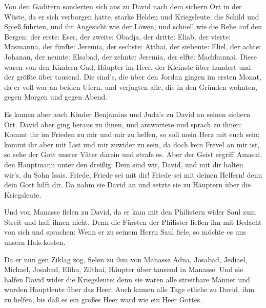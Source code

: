  Von den Gaditern sonderten sich aus zu David nach dem
sichern Ort in der Wüste, da er sich verborgen hatte, starke Helden und
Kriegsleute, die Schild und Spieß führten, und ihr Angesicht wie der
Löwen, und schnell wie die Rehe auf den Bergen:  der erste:
Eser, der zweite: Obadja, der dritte: Eliab,  der vierte:
Masmanna, der fünfte: Jeremia,  der sechste: Atthai, der
siebente: Eliel,  der achte: Johanan, der neunte: Elsabad,
 der zehnte: Jeremia, der elfte: Machbannai. 
Diese waren von den Kindern Gad, Häupter im Heer, der Kleinste über
hundert und der größte über tausend.  Die sind's, die über
den Jordan gingen im ersten Monat, da er voll war an beiden Ufern, und
verjagten alle, die in den Gründen wohnten, gegen Morgen und gegen
Abend.

 Es kamen aber auch Kinder Benjamins und Juda's zu David an
seinen sichern Ort.  David aber ging heraus zu ihnen, und
antwortete und sprach zu ihnen: Kommt ihr im Frieden zu mir und mir zu
helfen, so soll mein Herz mit euch sein; kommt ihr aber mit List und mir
zuwider zu sein, da doch kein Frevel an mir ist, so sehe der Gott unsrer
Väter darein und strafe es.  Aber der Geist ergriff Amasai,
den Hauptmann unter den dreißig: Dein sind wir, David, und mit dir
halten wir's, du Sohn Isais. Friede, Friede sei mit dir! Friede sei mit
deinen Helfern! denn dein Gott hilft dir. Da nahm sie David an und
setzte sie zu Häuptern über die Kriegsleute.

 Und von Manasse fielen zu David, da er kam mit den
Philistern wider Saul zum Streit und half ihnen nicht. Denn die Fürsten
der Philister ließen ihn mit Bedacht von sich und sprachen: Wenn er zu
seinem Herrn Saul fiele, so möchte es uns unsern Hals kosten.

 Da er nun gen Ziklag zog, fielen zu ihm von Manasse Adna,
Josabad, Jediael, Michael, Josabad, Elihu, Zilthai, Häupter über tausend
in Manasse.  Und sie halfen David wider die Kriegsleute;
denn sie waren alle streitbare Männer und wurden Hauptleute über das
Heer.  Auch kamen alle Tage etliche zu David, ihm zu
helfen, bis daß es ein großes Heer ward wie ein Heer Gottes.

